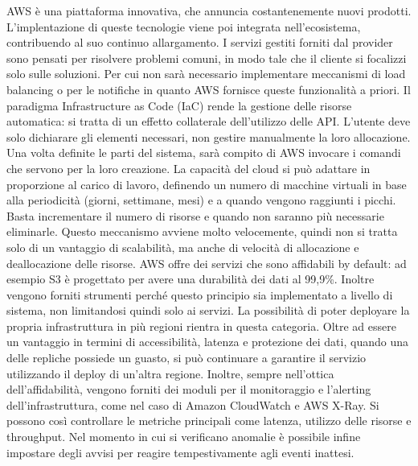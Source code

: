 AWS è una piattaforma innovativa, che annuncia costantenemente nuovi prodotti. L'implentazione di queste tecnologie viene poi integrata nell'ecosistema, contribuendo al suo continuo allargamento. %
I servizi gestiti forniti dal provider sono pensati per risolvere problemi comuni, in modo tale che il cliente si focalizzi solo sulle soluzioni. Per cui non sarà necessario implementare meccanismi di load balancing o per le notifiche in quanto AWS fornisce queste funzionalità a priori. %
Il paradigma Infrastructure as Code (IaC) rende la gestione delle risorse automatica: si tratta di un effetto collaterale dell'utilizzo delle API. L'utente deve solo dichiarare gli elementi necessari, non gestire manualmente la loro allocazione. Una volta definite le parti del sistema, sarà compito di AWS invocare i comandi che servono per la loro creazione. %
La capacità del cloud si può adattare in proporzione al carico di lavoro, definendo un numero di macchine virtuali in base alla periodicità (giorni, settimane, mesi) e a quando vengono raggiunti i picchi. Basta incrementare il numero di risorse e quando non saranno più necessarie eliminarle. Questo meccanismo avviene molto velocemente, quindi non si tratta solo di un vantaggio di scalabilità, ma anche di velocità di allocazione e deallocazione delle risorse. %
AWS offre dei servizi che sono affidabili by default: ad esempio S3 è progettato per avere una durabilità dei dati al 99,9\%. Inoltre vengono forniti strumenti perché questo principio sia implementato a livello di sistema, non limitandosi quindi solo ai servizi. La possibilità di poter deployare la propria infrastruttura in più regioni rientra in questa categoria. Oltre ad essere un vantaggio in termini di accessibilità, latenza e protezione dei dati, quando una delle repliche possiede un guasto, si può continuare a garantire il servizio utilizzando il deploy di un'altra regione. Inoltre, sempre nell'ottica dell'affidabilità, vengono forniti dei moduli per il monitoraggio e l'alerting dell'infrastruttura, come nel caso di Amazon CloudWatch e AWS X-Ray. Si possono così controllare le metriche principali come latenza, utilizzo delle risorse e throughput. Nel momento in cui si verificano anomalie è possibile infine impostare degli avvisi per reagire tempestivamente agli eventi inattesi. 

